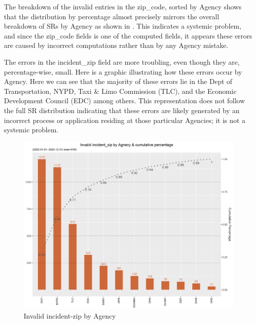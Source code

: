 \documentclass[12pt, titlepage]{article}
\begin{document}
	The breakdown of the invalid entries in the zip\_code, sorted by Agency shows that the distribution by percentage
	almost precisely mirrors the overall breakdown of SRs by Agency as shown in . This indicates a systemic problem, and since the
	zip\_code fields is one of the computed fields, it appears these errors are caused by incorrect computations rather
	than by any Agency mistake.
	
	The  errors in the incident\_zip field are more troubling, even though they are, percentage-wise, small. Here is a graphic 
	illustrating how these errors occur by Agency. Here we can see that the majority of these errors lie in the Dept of Transportation,
	NYPD, Taxi \& Limo Commission (TLC), and the Economic Development Council (EDC) among others. This representation
	does not follow the full SR distribution indicating that these errors are likely generated by an incorrect
	process or application residing at those particular Agencies; it is not a systemic problem.

	\begin{figure}[H]
	  \centering
		  \includegraphics[width=\textwidth]{invalid_incident_zip.png}
		  \caption{Invalid incident-zip by Agency}
		  \label{fig:invalid_incident_zip}
	\end{figure}
	
\end{document}
